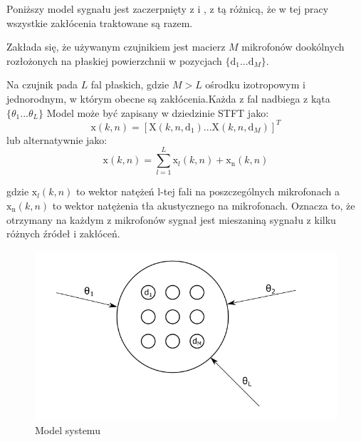 \newpage 

Poniższy model sygnału jest zaczerpnięty z \cite{Thiergart2013} i \cite{Braun2014}, z tą różnicą, że w tej pracy wszystkie zakłócenia traktowane są razem.

\noindent Zakłada się, że używanym czujnikiem jest macierz $M$ mikrofonów dookólnych rozłożonych na płaskiej powierzchnii w pozycjach $\{\bm{\mathrm{d}}_1...\bm{\mathrm{d}}_M\}$.

\noindent Na czujnik pada $L$ fal płaskich, gdzie $M > L$ ośrodku izotropowym i jednorodnym, w którym obecne są zakłócenia.Każda z fal nadbiega z kąta $\{{\theta}_1...{\theta}_L\}$ Model może być zapisany w dziedzinie STFT jako:
\begin{equation}
    \label{equation:2.1}
    \bm{\mathrm{x}}(k,n)
    =
    [\mathrm{X}(k,n,\bm{\mathrm{d}}_{1})
    ...
    \mathrm{X}(k,n,\bm{\mathrm{d}}_{M})]^{T}
\end{equation}
lub alternatywnie jako:
\begin{equation}
    \label{equation:2.2}
    \bm{\mathrm{x}}(k,n)=
    \sum_{l=1}^{L} \bm{\mathrm{x}}_{l}(k,n)
    + \bm{\mathrm{x}}_{\mathrm{n}}(k,n)
\end{equation}

\noindent gdzie $\bm{\mathrm{x}}_l(k,n)$ to wektor natężeń l-tej fali na poszczególnych mikrofonach a $\bm{\mathrm{x}}_{\mathrm{n}}(k,n)$ to wektor natężenia tła akustycznego na mikrofonach.
Oznacza to, że otrzymany na każdym z mikrofonów sygnał jest mieszaniną sygnału z kilku różnych źródeł i zakłóceń.

\begin{figure}[h]
    \centering
    \includegraphics[width=\textwidth]{Images/model.png}
    \caption{Model systemu}
    \label{fig:model}
\end{figure}


